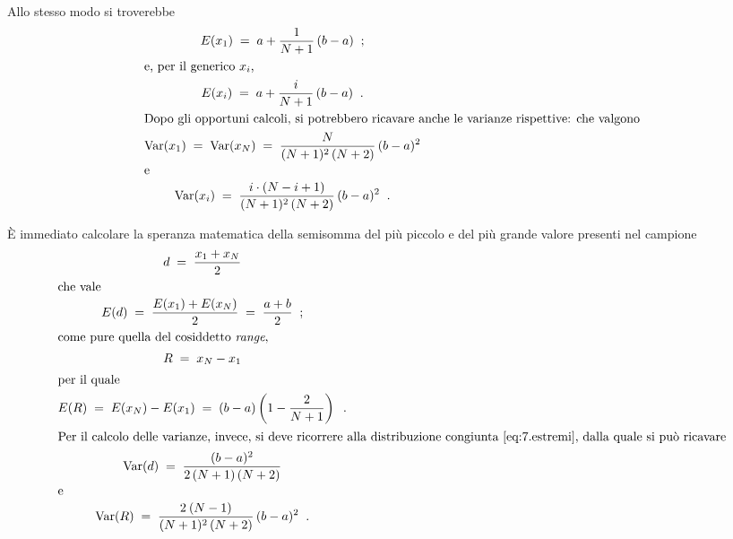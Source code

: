 Allo stesso modo si troverebbe
\begin{gather*}
  E ( x_1 ) \; = \; a + \frac{1}{N + 1} \, (b - a) \;\; ; \\
  \intertext{e, per il generico $x_i$,}
  E ( x_i ) \; = \; a + \frac{i}{N + 1} \, (b - a) \;\; . \\
  \intertext{Dopo gli opportuni calcoli, si potrebbero
    ricavare anche le varianze rispettive: che valgono}
  \operatorname{Var}( x_1 ) \; = \; \operatorname{Var}( x_N ) \; = \; \frac{N}{(N +
    1)^2 \, (N + 2)} \, (b - a)^2 \\
  \intertext{e}
  \operatorname{Var}( x_i ) \; = \; \frac{i \cdot (N - i + 1)}{(N + 1)^2
    \, (N + 2)} \, (b - a)^2 \;\; .
\end{gather*}

\`E immediato calcolare la speranza matematica della
semisomma del pi\`u piccolo e del pi\`u grande valore
presenti nel campione
\begin{gather*}
  d \; = \; \frac{x_1 + x_N}{2} \\
  \intertext{che vale}
  E(d) \; = \; \frac{ E(x_1) + E(x_N) }{2} \; = \;
  \frac{a+b}{2} \peq ; \\
  \intertext{come pure quella del cosiddetto \emph{range},%
    \index{distribuzione!uniforme!range|(}%
    }
  R \; = \; x_N - x_1 \\
  \intertext{per il quale}
  E(R) \; = \; E(x_N) - E(x_1) \; = \; (b - a) \left( 1 -
    \frac{2}{N + 1} \right) \peq . \\
  \intertext{Per il calcolo delle varianze, invece, si deve
    ricorrere alla distribuzione congiunta
    \eqref{eq:7.estremi}, dalla quale si pu\`o ricavare}
  \var(d) \; = \; \frac{(b - a)^2}{2 \, (N + 1) \, ( N + 2)}
  \\
  \intertext{e}
  \var(R) \; = \; \frac{2 \: (N - 1)}{(N + 1)^2 \, (N + 2)}
  \, (b - a)^2 \peq .
\end{gather*}%
%

